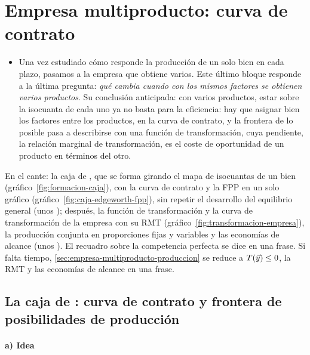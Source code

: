 \documentclass[11pt]{article}
\begin{document}
\section{Empresa multiproducto: curva de contrato}\label{sec:empresa-multiproducto-curva}

\begin{itemize}
\item Una vez estudiado cómo responde la producción de un solo bien en cada plazo, pasamos a la empresa que obtiene varios. Este último bloque responde a la última pregunta: \emph{qué cambia cuando con los mismos factores se obtienen varios productos}. Su conclusión anticipada: con varios productos, estar sobre la isocuanta de cada uno ya no basta para la eficiencia: hay que asignar bien los factores entre los productos, en la curva de contrato, y la frontera de lo posible pasa a describirse con una función de transformación, cuya pendiente, la relación marginal de transformación, es el coste de oportunidad de un producto en términos del otro.
\end{itemize}

\begin{notaopositor}
En el cante: la caja de , que se forma girando el mapa de isocuantas de un bien (gráfico~\ref{fig:formacion-caja}), con la curva de contrato y la FPP en un solo gráfico (gráfico~\ref{fig:caja-edgeworth-fpp}), sin repetir el desarrollo del equilibrio general (unos ); después, la función de transformación y la curva de transformación de la empresa con su RMT (gráfico~\ref{fig:transformacion-empresa}), la producción conjunta en proporciones fijas y variables y las economías de alcance (unos ). El recuadro sobre la competencia perfecta se dice en una frase. Si falta tiempo, \ref{sec:empresa-multiproducto-produccion} se reduce a $T(\vec{y})\leq 0$, la RMT y las economías de alcance en una frase.
\end{notaopositor}

\subsection{La caja de : curva de contrato y frontera de posibilidades de producción}\label{sec:caja-edgeworth-curva}

\paragraph{a) Idea}
\end{document}

